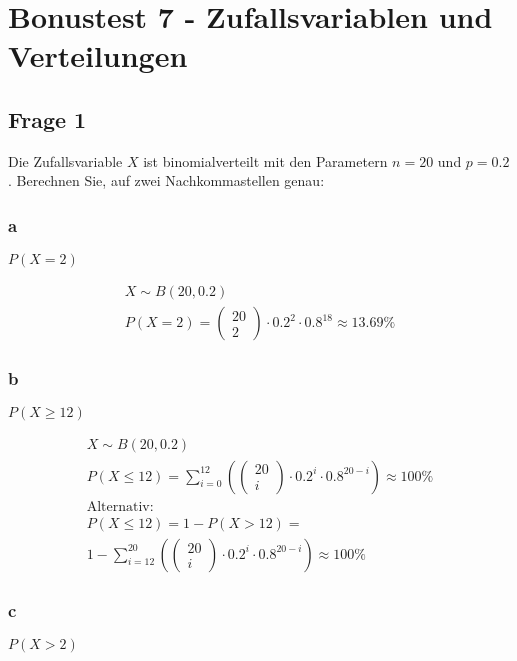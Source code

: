 \chapter{Bonustest 7 - Zufallsvariablen und Verteilungen}

\section{Frage 1}

Die Zufallsvariable $X$ ist binomialverteilt mit den Parametern $n=20$ und $p= 0.2$. Berechnen Sie, auf zwei Nachkommastellen genau: 

\subsection{a}
$P(X = 2)$

\begin{align*}
    X \sim B(20, 0.2) \\
    P(X = 2) = \begin{pmatrix}
        20 \\ 2
    \end{pmatrix} \cdot 0.2^2 \cdot 0.8^{18} \approx 13.69\%
\end{align*}

\subsection{b}
$P(X \geq 12)$

\begin{align*}
    X \sim B(20, 0.2) \\
    P(X \leq 12) = \sum_{i = 0}^{12} \left(\begin{pmatrix}
        20 \\ i
    \end{pmatrix} \cdot 0.2^i \cdot 0.8^{20 - i}\right) \approx 100\% \\
    \text{Alternativ:} \\
    P(X \leq 12) = 1 - P(X > 12) = \\
    1 - \sum_{i = 12}^{20} \left(\begin{pmatrix}
        20 \\ i
    \end{pmatrix} \cdot 0.2^i \cdot 0.8^{20 - i}\right) \approx 100\%
\end{align*}

\subsection{c}
$P(X > 2)$

